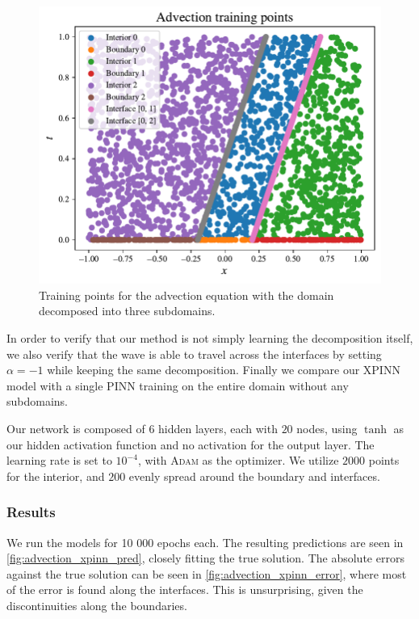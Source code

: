 \begin{figure}[h]
    \centering
    \includegraphics[width=0.9\linewidth]{Project1XPINNs/figures/advection/advection_train.pdf}
    \caption{Training points for the advection equation with the domain decomposed into three subdomains.}
    \label{fig:decomp_advection}
\end{figure}

In order to verify that our method is not simply learning the decomposition itself, we also verify that the wave is able to travel across the interfaces by setting $\alpha = -1$ while keeping the same decomposition.
Finally we compare our XPINN model with a single PINN training on the entire domain without any subdomains. 

Our network is composed of $6$ hidden layers, each with $20$ nodes, using $\tanh$ as our hidden activation function and no activation for the output layer. The learning rate is set to $10^{-4}$, with \textsc{Adam} as the optimizer.
We utilize $2000$ points for the interior, and $200$ evenly spread around the boundary and interfaces. 

\subsubsection{Results}
We run the models for 10 000 epochs each.
The resulting predictions are seen in \autoref{fig:advection_xpinn_pred}, closely fitting the true solution.
The absolute errors against the true solution can be seen in \autoref{fig:advection_xpinn_error}, where most of the error is found along the interfaces.
This is unsurprising, given the discontinuities along the boundaries.


